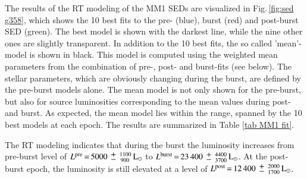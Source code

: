  

The results of the RT modeling of the MM1 SEDs are visualized in
Fig.\,\ref{fig:sed g358}, which shows the 10 best fits to the pre- (blue), burst (red) and post-burst SED (green).
The best model is shown with the darkest line, while the nine other ones are slightly transparent.
In addition to the 10 best fits, the so called 'mean'-model is shown in black. This model is computed using the weighted mean parameters from the combination of pre-, post- and burst-fits (see below). The stellar parameters, which are obviously changing during the burst, are defined by the pre-burst models alone. The mean model is not only shown for the pre-burst, but also for source luminosities
corresponding to the
mean values during post- and burst. As expected, the mean model lies within the range, spanned by the 10 best models at each epoch. The results are summarized in Table \ref{tab MM1 fit}.



The RT modeling indicates that during the burst the luminosity increases from pre-burst level of $L^{\rm pre}\,{=}\,5000\,{\mypm}\, _{\,900}^{1100} \,{\rm L}_\odot$ to $L^{\rm burst}\,{=}\,23\,400\,{\mypm}\,_{3700}^{4400}\,{\rm L}_\odot$.
At the post-burst epoch, the luminosity is still elevated at a level of $L^{\rm post}\,{=}\,12\,400\,{\mypm}\,_{1700}^{2000}\,{\rm L}_\odot$.

